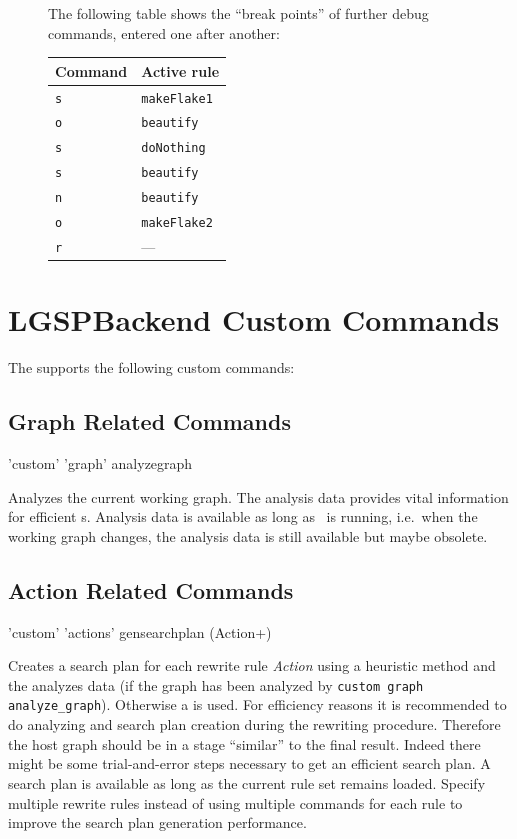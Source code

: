 \begin{figure}[htbp]
\begin{example}
\begin{center}
\end{center}
The following table shows the ``break points'' of further debug commands, entered one after another:
\begin{center}
  \begin{tabular}{|l|l|} \hline
    \textbf{Command} & \textbf{Active rule} \\ \hline
    \texttt{s} & \texttt{makeFlake1} \\
    \texttt{o} & \texttt{beautify} \\
    \texttt{s} & \texttt{doNothing} \\
    \texttt{s} & \texttt{beautify} \\ 
    \texttt{n} & \texttt{beautify} \\ 
    \texttt{o} & \texttt{makeFlake2} \\
    \texttt{r} & --- \\ \hline
  \end{tabular}
\end{center}
\end{example}   
\end{figure}


\section{LGSPBackend Custom Commands}
\label{custom}
The  supports the following custom commands:

\subsection{Graph Related Commands}
\begin{rail}
  'custom' 'graph' analyzegraph
\end{rail}
Analyzes the current working graph. The analysis data provides vital information for efficient s. Analysis data is available as long as \GrShell\ is running, i.e.\ when the working graph changes, the analysis data is still available but maybe obsolete.


\subsection{Action Related Commands}
\begin{rail}
  'custom' 'actions' gensearchplan (Action+)
\end{rail}
Creates a search plan for each rewrite rule \emph{Action} using a heuristic method and the analyzes data (if the graph has been analyzed by \texttt{custom graph analyze\_graph}). Otherwise a  is used. For efficiency reasons it is recommended to do analyzing and search plan creation during the rewriting procedure. Therefore the host graph should be in a stage ``similar'' to the final result. Indeed there might be some trial-and-error steps necessary to get an efficient search plan. A search plan is available as long as the current rule set remains loaded. 
Specify multiple rewrite rules instead of using multiple commands for each rule to improve the search plan generation performance.

